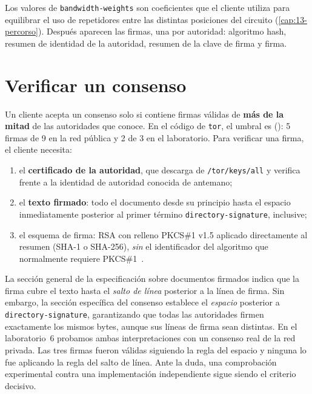Los valores de \texttt{bandwidth-weights} son coeficientes que el cliente utiliza para equilibrar el uso de repetidores entre las distintas posiciones del circuito (\cref{cap:13-percorso}). Después aparecen las firmas, una por autoridad: algoritmo hash, resumen de identidad de la autoridad, resumen de la clave de firma y firma.

\section{Verificar un consenso}\label{sec:dir-firme}

Un cliente acepta un consenso solo si contiene firmas válidas de \textbf{más de la mitad} de las autoridades que conoce. En el código de \texttt{tor}, el umbral es  (): 5 firmas de 9 en la red pública y 2 de 3 en el laboratorio. Para verificar una firma, el cliente necesita:
\begin{enumerate}
  \item el \textbf{certificado de la autoridad}, que descarga de \nolinkurl{/tor/keys/all} y verifica frente a la identidad de autoridad conocida de antemano;
  \item el \textbf{texto firmado}: todo el documento desde su principio hasta el espacio inmediatamente posterior al primer término \texttt{directory-signature}, inclusive;
  \item el esquema de firma: RSA con relleno PKCS\#1 v1.5 aplicado directamente al resumen (SHA-1 o SHA-256), \emph{sin} el identificador del algoritmo que normalmente requiere PKCS\#1~.
\end{enumerate}

\begin{approfondimento}
La sección general de la especificación sobre documentos firmados indica que la firma cubre el texto hasta el \emph{salto de línea} posterior a la línea de firma. Sin embargo, la sección específica del consenso establece el \emph{espacio} posterior a \texttt{directory-signature}, garantizando que todas las autoridades firmen exactamente los mismos bytes, aunque sus líneas de firma sean distintas. En el laboratorio~6 probamos ambas interpretaciones con un consenso real de la red privada. Las tres firmas fueron válidas siguiendo la regla del espacio y ninguna lo fue aplicando la regla del salto de línea. Ante la duda, una comprobación experimental contra una implementación independiente sigue siendo el criterio decisivo.
\end{approfondimento}

